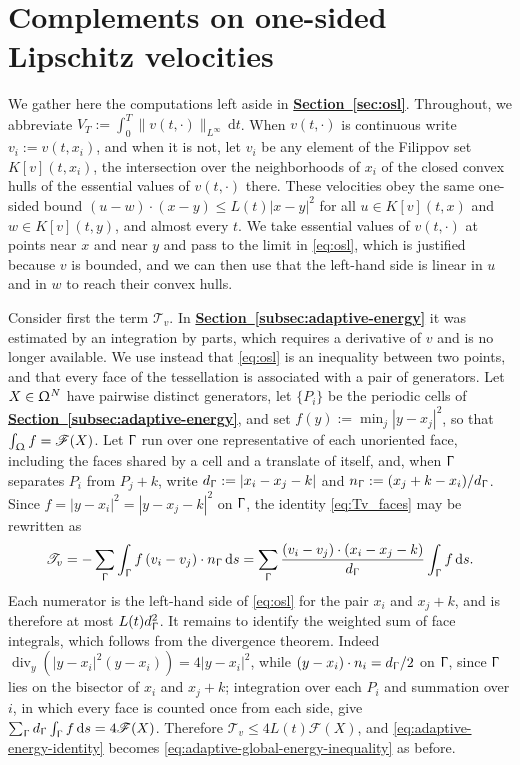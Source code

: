 \documentclass[letterpaper,11pt,twoside]{article}
\numberwithin{figure}{section}
\numberwithin{table}{section}
\theoremstyle{cpamplain}
\theoremstyle{cpamdefinition}
\newcommand{\diff}{\mathrm{d}}
\newcommand{\Secref}[1]{\textbf{\hyperref[#1]{Section~\ref*{#1}}}}
\let\Gamma\Upgamma
\let\Omega\Upomega
\renewcommand{\le}{\leqslant}
\numberwithin{equation}{section}
\begin{document}
\section{Complements on one-sided Lipschitz velocities}\label{sec:appendix-osl}

We gather here the computations left aside in \Secref{sec:osl}.
Throughout, we abbreviate $V_T:=\int_0^T\|v(t,\cdot)\|_{L^\infty}\,\diff t$.
When $v(t,\cdot)$ is continuous write $v_i:=v(t,x_i)$, and when it is not, let $v_i$ be any element of the Filippov set $K[v](t,x_i)$, the intersection over the neighborhoods of $x_i$ of the closed convex hulls of the essential values of $v(t,\cdot)$ there.
These velocities obey the same one-sided bound $(u-w)\cdot(x-y)\le L(t)|x-y|^2$ for all $u\in K[v](t,x)$ and $w\in K[v](t,y)$, and almost every $t$.
We take essential values of $v(t,\cdot)$ at points near $x$ and near $y$ and pass to the limit in \eqref{eq:osl}, which is justified because $v$ is bounded, and we can then use that the left-hand side is linear in $u$ and in $w$ to reach their convex hulls.

Consider first the term $\mathscr T_v$.
In \Secref{subsec:adaptive-energy} it was estimated by an integration by parts, which requires a derivative of $v$ and is no longer available.
We use instead that \eqref{eq:osl} is an inequality between two points, and that every face of the tessellation is associated with a pair of generators.
Let $X\in\Omega^N$ have pairwise distinct generators, let $\{P_i\}$ be the periodic cells of \Secref{subsec:adaptive-energy}, and set $f(y):=\min_j|y-x_j|^2$, so that $\int_\Omega f=\mathscr F(X)$.
Let $\Gamma$ run over one representative of each unoriented face, including the faces shared by a cell and a translate of itself, and, when $\Gamma$ separates $P_i$ from $P_j+k$, write $d_\Gamma:=|x_i-x_j-k|$ and $n_\Gamma:=(x_j+k-x_i)/d_\Gamma$.
Since $f=|y-x_i|^2=|y-x_j-k|^2$ on $\Gamma$, the identity \eqref{eq:Tv_faces} may be rewritten as
\[
\mathscr T_v=-\sum_\Gamma\int_\Gamma f\left(v_i-v_j\right)\cdot n_\Gamma\,\diff s
=\sum_\Gamma\frac{\left(v_i-v_j\right)\cdot\left(x_i-x_j-k\right)}{d_\Gamma}\int_\Gamma f\,\diff s .
\]
Each numerator is the left-hand side of \eqref{eq:osl} for the pair $x_i$ and $x_j+k$, and is therefore at most $L(t)d_\Gamma^2$.
It remains to identify the weighted sum of face integrals, which follows from the divergence theorem.
Indeed $\operatorname{div}_y\left(|y-x_i|^2(y-x_i)\right)=4|y-x_i|^2$, while $(y-x_i)\cdot n_i=d_\Gamma/2$ on $\Gamma$, since $\Gamma$ lies on the bisector of $x_i$ and $x_j+k$; integration over each $P_i$ and summation over $i$, in which every face is counted once from each side, give $\sum_\Gamma d_\Gamma\int_\Gamma f\,\diff s=4\mathscr F(X)$.
Therefore $\mathscr T_v\le4L(t)\mathscr F(X)$, and \eqref{eq:adaptive-energy-identity} becomes \eqref{eq:adaptive-global-energy-inequality} as before.
\end{document}
